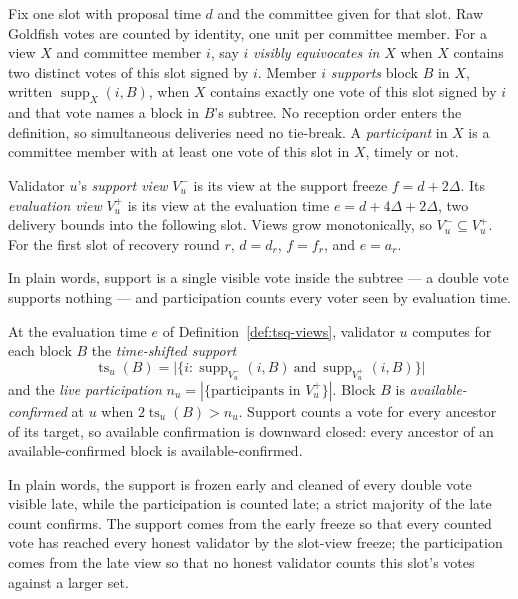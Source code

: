 \begin{definition}
\label{def:tsq-views}
Fix one slot with proposal time \(d\) and the committee given for that
slot.  Raw Goldfish votes are counted by identity, one unit per committee
member.  For a view \(X\) and committee member \(i\), say \(i\)
\emph{visibly equivocates in \(X\)} when \(X\) contains two distinct votes
of this slot signed by \(i\).  Member \(i\) \emph{supports} block \(B\) in
\(X\), written \(\operatorname{supp}_X(i,B)\), when \(X\) contains exactly
one vote of this slot signed by \(i\) and that vote names a block in
\(B\)'s subtree.  No reception order enters the definition, so
simultaneous deliveries need no tie-break.  A \emph{participant} in \(X\)
is a committee member with at least one vote of this slot in \(X\), timely
or not.

Validator \(u\)'s \emph{support view} \(V_u^-\) is its view at the
support freeze \(f=d+2\Delta\).  Its \emph{evaluation view}
\(V_u^+\) is its view at the evaluation time \(e=d+4\Delta+2\Delta\), two
delivery bounds into the following slot.  Views grow monotonically, so
\(V_u^-\subseteq V_u^+\).  For the first slot of recovery round \(r\),
\(d=d_r\), \(f=f_r\), and \(e=a_r\).

In plain words, support is a single visible vote inside the subtree --- a
double vote supports nothing --- and participation counts every voter seen
by evaluation time.
\end{definition}

\begin{definition}
\label{def:tsq-confirmation}
At the evaluation time \(e\) of Definition~\ref{def:tsq-views}, validator
\(u\) computes for each block \(B\) the
\emph{time-shifted support}
\[
 \operatorname{ts}_u(B)=\bigl|\{i:\operatorname{supp}_{V_u^-}(i,B)\ \text{and}\
 \operatorname{supp}_{V_u^+}(i,B)\}\bigr|
\]
and the \emph{live participation}
\(n_u=|\{\text{participants in }V_u^+\}|\).
Block \(B\) is \emph{available-confirmed} at \(u\) when \(2\operatorname{ts}_u(B)>n_u\).
Support counts a vote for every ancestor of its target, so available
confirmation is downward closed: every ancestor of an available-confirmed
block is available-confirmed.

In plain words, the support is frozen early and cleaned of every double
vote visible late, while the participation is counted late; a strict
majority of the late count confirms.  The support comes from the early
freeze so that every counted vote has reached every honest validator by
the slot-view freeze; the participation comes from the late view so that
no honest validator counts this slot's votes against a larger set.
\end{definition}

